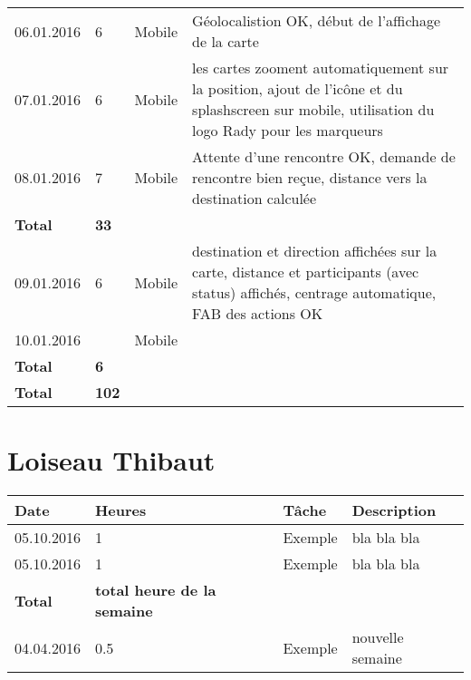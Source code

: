 \documentclass[french]{article}
\begin{document}
\begin{longtable}{p{}|p{}|p{}|p{}}
		06.01.2016 & 6 & Mobile & Géolocalistion OK, début de l'affichage de la carte\\
		07.01.2016 & 6 & Mobile & les cartes zooment automatiquement sur la position, ajout de l'icône et du splashscreen sur mobile, utilisation du logo Rady pour les marqueurs\\
		08.01.2016 & 7 & Mobile & Attente d'une rencontre OK, demande de rencontre bien reçue, distance vers la destination calculée\\
		\textbf{Total} & \textbf{33} &&\\
		\hline
		09.01.2016 & 6 & Mobile & destination et direction affichées sur la carte, distance et participants (avec status) affichés, centrage automatique, FAB des actions OK\\
		10.01.2016 & & Mobile & \\
		\textbf{Total} & \textbf{6} &&\\
		\hline\hline
		\textbf{Total} & \textbf{102} &&\\
	\end{longtable}

	\section*{Loiseau Thibaut}
	\begin{longtable}{p{}|p{}|p{}|p{}}
		Date&Heures&Tâche&Description\\
		\hline \hline
		05.10.2016 & 1 & Exemple & bla bla bla\\
		05.10.2016 & 1 & Exemple & bla bla bla\\
		\textbf{Total} & \textbf{total heure de la semaine} &&\\
		\hline
		04.04.2016 & 0.5 & Exemple & nouvelle semaine \\
	\end{longtable}
	
\end{document}
